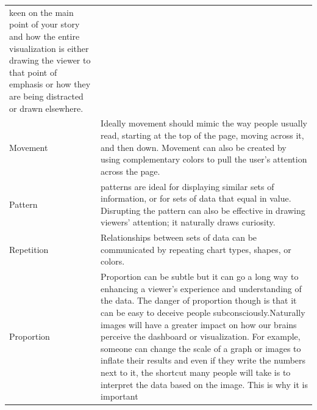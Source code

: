 \documentclass[]{book}
\theoremstyle{definition}
\theoremstyle{definition}
\theoremstyle{definition}
\theoremstyle{remark}
\begin{document}
\begin{longtable}[]{@{}ll@{}}
\begin{minipage}[t]{0.78\columnwidth}
keen on the main point of your story and how the entire visualization is
either drawing the viewer to that point of emphasis or how they are
being distracted or drawn elsewhere.\strut
\end{minipage}\tabularnewline
\begin{minipage}[t]{0.16\columnwidth}\raggedright\strut
Movement\strut
\end{minipage} & \begin{minipage}[t]{0.78\columnwidth}\raggedright\strut
Ideally movement should mimic the way people usually read, starting at
the top of the page, moving across it, and then down. Movement can also
be created by using complementary colors to pull the user's attention
across the page.\strut
\end{minipage}\tabularnewline
\begin{minipage}[t]{0.16\columnwidth}\raggedright\strut
Pattern\strut
\end{minipage} & \begin{minipage}[t]{0.78\columnwidth}\raggedright\strut
patterns are ideal for displaying similar sets of information, or for
sets of data that equal in value. Disrupting the pattern can also be
effective in drawing viewers' attention; it naturally draws
curiosity.\strut
\end{minipage}\tabularnewline
\begin{minipage}[t]{0.16\columnwidth}\raggedright\strut
Repetition\strut
\end{minipage} & \begin{minipage}[t]{0.78\columnwidth}\raggedright\strut
Relationships between sets of data can be communicated by repeating
chart types, shapes, or colors.\strut
\end{minipage}\tabularnewline
\begin{minipage}[t]{0.16\columnwidth}\raggedright\strut
Proportion\strut
\end{minipage} & \begin{minipage}[t]{0.78\columnwidth}\raggedright\strut
Proportion can be subtle but it can go a long way to enhancing a
viewer's experience and understanding of the data. The danger of
proportion though is that it can be easy to deceive people
subconsciously.Naturally images will have a greater impact on how our
brains perceive the dashboard or visualization. For example, someone can
change the scale of a graph or images to inflate their results and even
if they write the numbers next to it, the shortcut many people will take
is to interpret the data based on the image. This is why it is important

\end{minipage}
\end{longtable}
\end{document}
